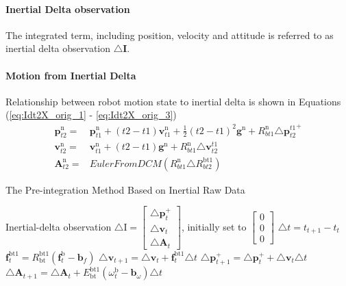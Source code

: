 \documentclass[12pt]{article}   %
\begin{document}
\paragraph{Inertial Delta observation} The integrated term, including position, velocity and attitude is referred to as inertial delta observation $\triangle \bm{I}$.

\paragraph{Motion from Inertial Delta}
Relationship between robot motion state to inertial delta is shown in Equations (\ref{eq:Idt2X_orig_1} - \ref{eq:Idt2X_orig_3})
\begin{align}
\bm{p}^{\mathrm{n}}_{t2} = & \bm{p}^{\mathrm{n}}_{t1} + (t2 - t1) \bm{v}^{\mathrm{n}}_{t1} + 
\frac{1}{2} (t2 - t1 )^2 \bm{g}^{\mathrm{n}} + R^{\mathrm{n}}_{bt1} \triangle {\bm{p}^{t1}_{t2}}^+ 
\label{eq:Idt2X_orig_1}\\
\bm{v}^{\mathrm{n}}_{t2} = & \bm{v}^{\mathrm{n}}_{t1} + (t2 - t1 ) \bm{g}^{\mathrm{n}} + R^{\mathrm{n}}_{bt1} \triangle \bm{v}^{t1}_{t2} 
\label{eq:Idt2X_orig_2}\\
\bm{A}^{\mathrm{n}}_{t2} = & EulerFromDCM( R^{\mathrm{n}}_{bt1} \triangle R^{\mathrm{bt1}}_{bt2} )
\label{eq:Idt2X_orig_3}
\end{align}

\begin{algorithm}
	\caption{The Pre-integration Method Based on Inertial Raw Data}
	\label{algm:preint}		
	\begin{algorithmic}
	\STATE Inertial-delta observation $ \triangle \bm{\mathrm{I}} = \begin{bmatrix} \triangle \textbf{p}_{t}^+ \\ \triangle \textbf{v}_{t} \\ \triangle \textbf{A} _{t} \end{bmatrix}$, initially set to $\begin{bmatrix} 0 \\ 0 \\ 0 \end{bmatrix}$
		\STATE $\triangle t =  t_{t+1} - t_t$ 
		\STATE $\textbf{f}_t^{\mathrm{bt1}} = R_{\mathrm{bt}}^{\mathrm{bt1}} (\textbf{f}_t^{\mathrm{b}} - \textbf{b}_f)$ 
		\STATE $\triangle \textbf{v}_{t+1} = \triangle \textbf{v}_{t} + \textbf{f}_t^{\mathrm{bt1}} \triangle t$ 
		\STATE $\triangle \textbf{p}_{t+1}^+ = \triangle \textbf{p}_{t}^+ + \triangle \textbf{v}_t \triangle t$ 
		\STATE $\triangle \textbf{A} _{t+1} = \triangle \textbf{A} _{t} + E_{\mathrm{bt}}^{\mathrm{bt1}} (\omega _t^{\mathrm{b}} - \textbf{b}_\omega) \triangle t$ 
		\ENDFOR
	\end{algorithmic}
\end{algorithm}
\end{document}
